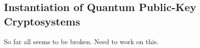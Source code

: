 \subsection{Instantiation of Quantum Public-Key Cryptosystems}

{\color{red} So far all seems to be broken. Need to work on this.}
%
%
%
%
%
%
